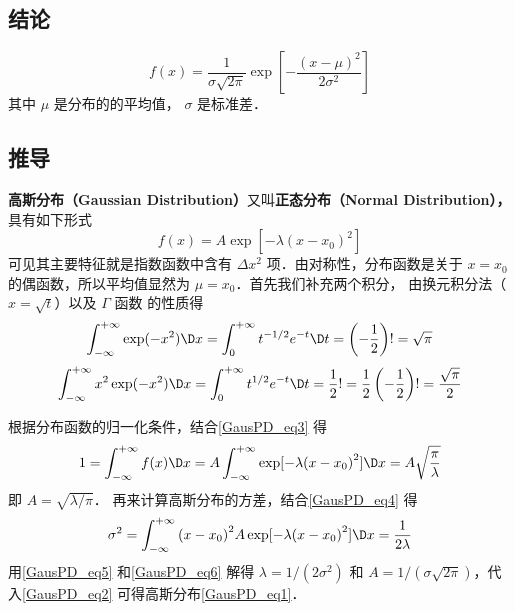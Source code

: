 \subsection{结论}
\begin{equation}\label{GausPD_eq1}
f(x) = \frac{1}{{\sigma \sqrt {2\pi } }}\exp \left[ { - \frac{{{{(x - \mu )}^2}}}{{2{\sigma ^2}}}} \right]
\end{equation}
其中 $\mu$ 是分布的的平均值， $\sigma$ 是标准差．

\subsection{推导}
\textbf{高斯分布（Gaussian Distribution）}又叫\textbf{正态分布（Normal Distribution），}具有如下形式
\begin{equation}\label{GausPD_eq2}
f\left( x \right) = A\exp [ - \lambda {(x - {x_0})^2}]
\end{equation}
可见其主要特征就是指数函数中含有 $\Delta x^2$ 项．由对称性，分布函数是关于 $x =x_0$ 的偶函数，所以平均值显然为 $\mu = x_0$．首先我们补充两个积分， 由换元积分法（$x=\sqrt{t}$）以及 $\Gamma$ 函数 的性质得
\begin{equation}\label{GausPD_eq3}
\int_{ - \infty }^{ + \infty } {\exp ( - {x^2})\D x}  = \int_0^{ + \infty } {{t^{ -1/2}}{e^{ - t}}\D t}  = \left( -\frac 12\right)! = \sqrt \pi 
\end{equation}
\begin{equation}\label{GausPD_eq4}
\int_{ - \infty }^{ + \infty } {{x^2}\exp ( - {x^2})\D x}  = \int_0^{ + \infty } {{t^{1/2}}{e^{ - t}}\D t}  = \frac{1}{2}! = \frac{1}{2}\left( { - \frac{1}{2}} \right)! = \frac{{\sqrt \pi  }}{2}
\end{equation}

根据分布函数的归一化条件，结合\autoref{GausPD_eq3} 得
\begin{equation}\label{GausPD_eq5}
1 = \int_{ - \infty }^{ + \infty } {f(x)\D x}  = A\int_{ - \infty }^{ + \infty } {\exp [ - \lambda {{(x - {x_0})}^2}]\D x}  = A\sqrt {\frac{\pi }{\lambda }}
\end{equation}
即 $A = \sqrt {\lambda /\pi }$． 再来计算高斯分布的方差，结合\autoref{GausPD_eq4} 得
\begin{equation}\label{GausPD_eq6}
{\sigma ^2} = \int_{ - \infty }^{ + \infty } {{{(x - {x_0})}^2}A\exp [ - \lambda {{(x - {x_0})}^2}]\D x}  = \frac{1}{{2\lambda }}
\end{equation}
用\autoref{GausPD_eq5} 和\autoref{GausPD_eq6} 解得 $\lambda = 1/(2\sigma^2)$ 和 $A = 1/(\sigma\sqrt{2\pi})$，代入\autoref{GausPD_eq2} 可得高斯分布\autoref{GausPD_eq1}．